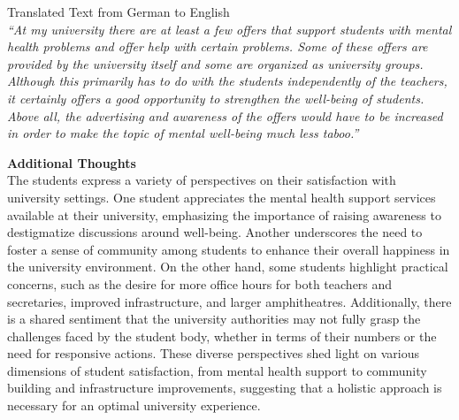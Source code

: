 \vspace{5mm}

\noindent Translated Text from German to English \\
\textit{``At my university there are at least a few offers that support students with mental health problems and offer help with certain problems. Some of these offers are provided by the university itself and some are organized as university groups. Although this primarily has to do with the students independently of the teachers, it certainly offers a good opportunity to strengthen the well-being of students. Above all, the advertising and awareness of the offers would have to be increased in order to make the topic of mental well-being much less taboo.''}

\vspace{5mm}

\noindent \textbf{Additional Thoughts} \\
The students express a variety of perspectives on their satisfaction with university settings. One student appreciates the mental health support services available at their university, emphasizing the importance of raising awareness to destigmatize discussions around well-being. Another underscores the need to foster a sense of community among students to enhance their overall happiness in the university environment. On the other hand, some students highlight practical concerns, such as the desire for more office hours for both teachers and secretaries, improved infrastructure, and larger amphitheatres. Additionally, there is a shared sentiment that the university authorities may not fully grasp the challenges faced by the student body, whether in terms of their numbers or the need for responsive actions. These diverse perspectives shed light on various dimensions of student satisfaction, from mental health support to community building and infrastructure improvements, suggesting that a holistic approach is necessary for an optimal university experience.

